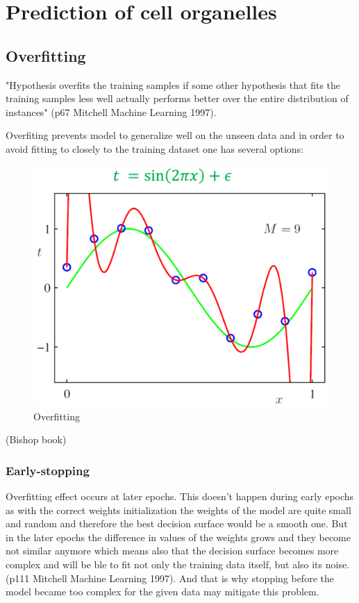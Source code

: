 \section{Prediction of cell organelles}
\subsection{Overfitting}

\begin{definition}[Overfitting]
    "Hypothesis overfits the training samples if some other hypothesis that fits the training samples less well actually performs better over the entire distribution of instances" (p67 Mitchell Machine Learning 1997).
\end{definition}

Overfiting prevents model to generalize well on the unseen data and in order to avoid fitting to closely to the training dataset one has several options:

\begin{figure}[htb]
	\begin{center}
		\includegraphics[width=0.6\linewidth]{bilder/overfit.png}
		\caption{Overfitting}\label{fig:overfit}
	\end{center}
\end{figure}

(Bishop book)

\subsubsection{Early-stopping}
Overfitting effect occurs at later epochs. This doesn't happen during early epochs as with the correct weights initialization the weights of the model are quite small and random and therefore the best decision surface would be a smooth one. But in the later epochs the difference in values of the weights grows and they become not similar anymore which means also that the decision surface becomes more complex and will be ble to fit not only the training data itself, but also its noise. (p111 Mitchell Machine Learning 1997). And that is why stopping before the model became too complex for the given data may mitigate this problem.

